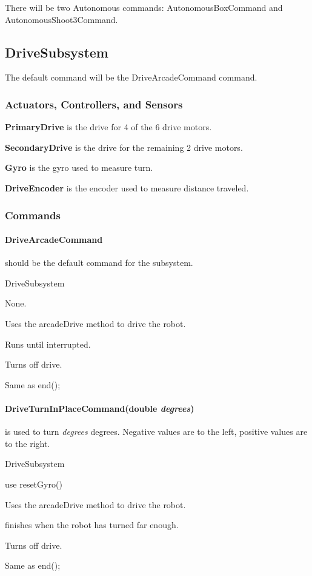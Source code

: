 \documentclass[]{article}
\begin{document}
There will be two Autonomous commands: AutonomousBoxCommand and AutonomousShoot3Command.

\subsection{DriveSubsystem}

The default command will be the DriveArcadeCommand command.

\subsubsection{Actuators, Controllers, and Sensors}

\textbf{PrimaryDrive} is the drive for 4 of the 6 drive motors.

\textbf{SecondaryDrive} is the drive for the remaining 2 drive motors.

\textbf{Gyro} is the gyro used to measure turn.

\textbf{DriveEncoder} is the encoder used to measure distance traveled.

\subsubsection{Commands}

\paragraph{DriveArcadeCommand} should be the default command for the subsystem.
\begin{description}[topsep=0ex]
\item[requires] DriveSubsystem
\item[initialization]  None.
\item[execute] Uses the arcadeDrive method to drive the robot.
\item[isDone] Runs until interrupted.
\item[end] Turns off drive.
\item[interrupted] Same as end();
\end{description}

\paragraph{DriveTurnInPlaceCommand(double \textit{degrees})} is used to turn \textit{degrees} degrees. Negative values are to the left, positive values are to the right.
\begin{description}[topsep=0ex]
\item[requires] DriveSubsystem
\item[initialization]  use resetGyro()
\item[execute] Uses the arcadeDrive method to drive the robot.
\item[isDone] finishes when the robot has turned far enough.
\item[end] Turns off drive.
\item[interrupted] Same as end();
\end{description}
\end{document}
